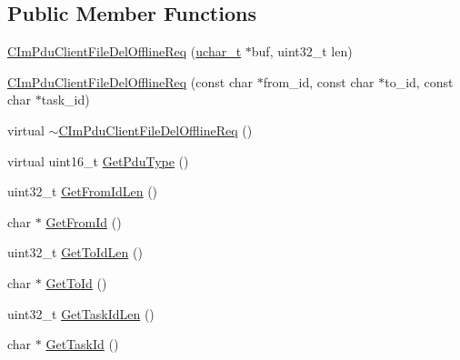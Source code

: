 \subsection*{Public Member Functions}
\begin{DoxyCompactItemize}
\item 
\hyperlink{class_c_im_pdu_client_file_del_offline_req_abefe79e5395429e1e81e31854e4a82d0}{C\+Im\+Pdu\+Client\+File\+Del\+Offline\+Req} (\hyperlink{base_2ostype_8h_a124ea0f8f4a23a0a286b5582137f0b8d}{uchar\+\_\+t} $\ast$buf, uint32\+\_\+t len)
\item 
\hyperlink{class_c_im_pdu_client_file_del_offline_req_a2c323a4ed8c8fbe69cf9d0bd3999b128}{C\+Im\+Pdu\+Client\+File\+Del\+Offline\+Req} (const char $\ast$from\+\_\+id, const char $\ast$to\+\_\+id, const char $\ast$task\+\_\+id)
\item 
virtual \hyperlink{class_c_im_pdu_client_file_del_offline_req_ae4e2c767d12be450330f57d7517dcf9e}{$\sim$\+C\+Im\+Pdu\+Client\+File\+Del\+Offline\+Req} ()
\item 
virtual uint16\+\_\+t \hyperlink{class_c_im_pdu_client_file_del_offline_req_aa560403b4c8b182d12a87236595e40a1}{Get\+Pdu\+Type} ()
\item 
uint32\+\_\+t \hyperlink{class_c_im_pdu_client_file_del_offline_req_a52397bcce65a70a19c392bb4e63c1bd8}{Get\+From\+Id\+Len} ()
\item 
char $\ast$ \hyperlink{class_c_im_pdu_client_file_del_offline_req_a7c425b61c8af625a7fc16a4d7b541756}{Get\+From\+Id} ()
\item 
uint32\+\_\+t \hyperlink{class_c_im_pdu_client_file_del_offline_req_a99d2aa87a9964a933491e8fd2e7d0dd7}{Get\+To\+Id\+Len} ()
\item 
char $\ast$ \hyperlink{class_c_im_pdu_client_file_del_offline_req_a0e88e80003d7bc04bb133a84d55de42f}{Get\+To\+Id} ()
\item 
uint32\+\_\+t \hyperlink{class_c_im_pdu_client_file_del_offline_req_a7ac3a4aa5ae3122bc398b422eb56c725}{Get\+Task\+Id\+Len} ()
\item 
char $\ast$ \hyperlink{class_c_im_pdu_client_file_del_offline_req_a83943d39ab9ec8ad11308ff2c692e7cc}{Get\+Task\+Id} ()
\end{DoxyCompactItemize}
